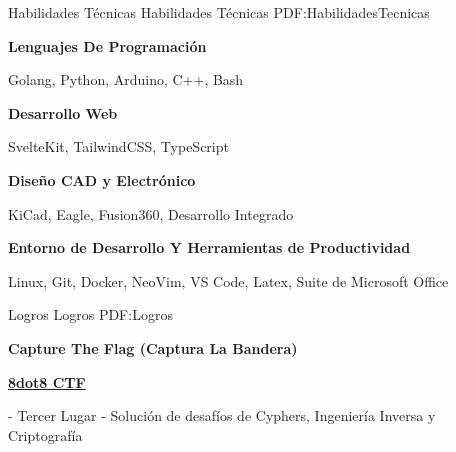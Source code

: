 \documentclass[letterpaper,yyyy,draft]{simpleresumecv}
\begin{document}
\begin{Body}

\Section
{Habilidades Técnicas}
{Habilidades Técnicas}
{PDF:HabilidadesTecnicas}
{
    {
        \BulletItem
        \textbf{Lenguajes De Programación}
        \hfill
        \Gap
        \begin{Detail}
        \SubBulletItem
        Golang, Python, Arduino, C++, Bash
        \end{Detail}
    }

    {
        \Gap
        \BulletItem
        \textbf{Desarrollo Web}
        \hfill
        \Gap
        \begin{Detail}
        \SubBulletItem
        SvelteKit, TailwindCSS, TypeScript
        \end{Detail}
    }

    {
        \Gap
        \BulletItem
        \textbf{Diseño CAD y Electrónico}
        \hfill
        \Gap
        \begin{Detail}
        \SubBulletItem
        KiCad, Eagle, Fusion360, Desarrollo Integrado
        \end{Detail}
    }

    {
        \Gap
        \BulletItem
        \textbf{Entorno de Desarrollo Y Herramientas de Productividad}
        \hfill
        \Gap
        \begin{Detail}
        \SubBulletItem
        Linux, Git, Docker, NeoVim, VS Code, Latex, Suite de Microsoft Office
        \end{Detail}
    }
}



\Section
{Logros}
{Logros}
{PDF:Logros}
{
    \Entry
    \textbf{Capture The Flag (Captura La Bandera)}
    {
        \Gap
        \BulletItem
        \href{https://8dot8.org}{\textbf{8dot8 CTF}}
        \hfill
        \begin{Detail}
         - Tercer Lugar - Solución de desafíos de Cyphers, Ingeniería Inversa y Criptografía
        \end{Detail}
    }

}
\end{Body}
\end{document}
